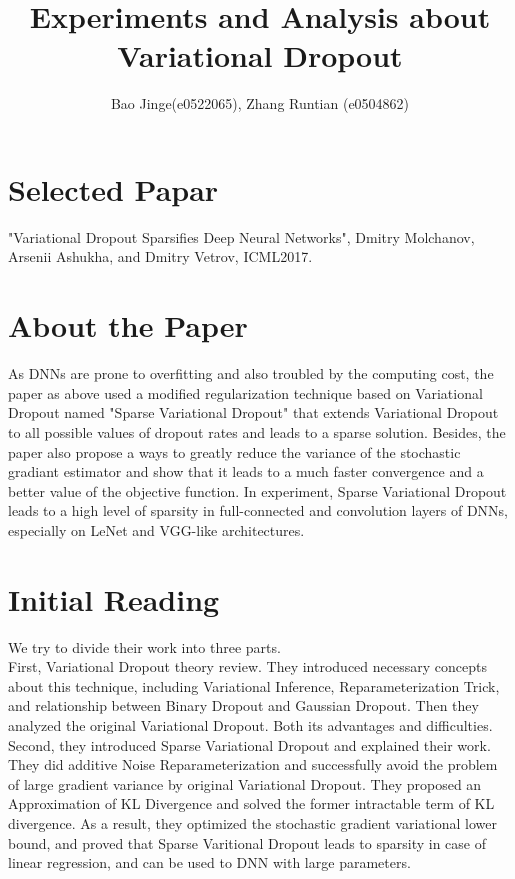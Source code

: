 \documentclass{article}
\author{Bao Jinge(e0522065), Zhang Runtian (e0504862)}
\title{Experiments and Analysis about Variational Dropout}
\date{}
\begin{document}
	\maketitle
	\section{Selected Papar}
		"Variational Dropout Sparsifies Deep Neural Networks", Dmitry Molchanov, Arsenii Ashukha, and Dmitry Vetrov, ICML2017\cite{molchanov2017variational}.

	\section{About the Paper}
		As DNNs are prone to overfitting and also troubled by the computing cost, the paper as above used a modified regularization technique based on Variational Dropout named "Sparse Variational Dropout" that extends Variational Dropout to all possible values of dropout rates and leads to a sparse solution. Besides, the paper also propose a ways to greatly reduce the variance of the stochastic gradiant estimator and show that it leads to a much faster convergence and a better value of the objective function. In experiment, Sparse Variational Dropout leads to a high level of sparsity in full-connected and convolution layers of DNNs, especially on LeNet and VGG-like architectures. 

	\section{Initial Reading}
		We try to divide their work into three parts. \\

		First, Variational Dropout theory review. They introduced necessary concepts about this technique, including Variational Inference, Reparameterization Trick, and relationship between Binary Dropout and Gaussian Dropout. Then they analyzed the original Variational Dropout. Both its advantages and difficulties.\\

		Second, they introduced Sparse Variational Dropout and explained their work. They did additive Noise Reparameterization and successfully avoid the problem of large gradient variance by original Variational Dropout. They proposed an Approximation of KL Divergence and solved the former intractable term of KL divergence. As a result, they optimized the stochastic gradient variational lower bound, and proved that Sparse Varitional Dropout leads to sparsity in case of linear regression, and can be used to DNN with large parameters.\\
	
\end{document}
